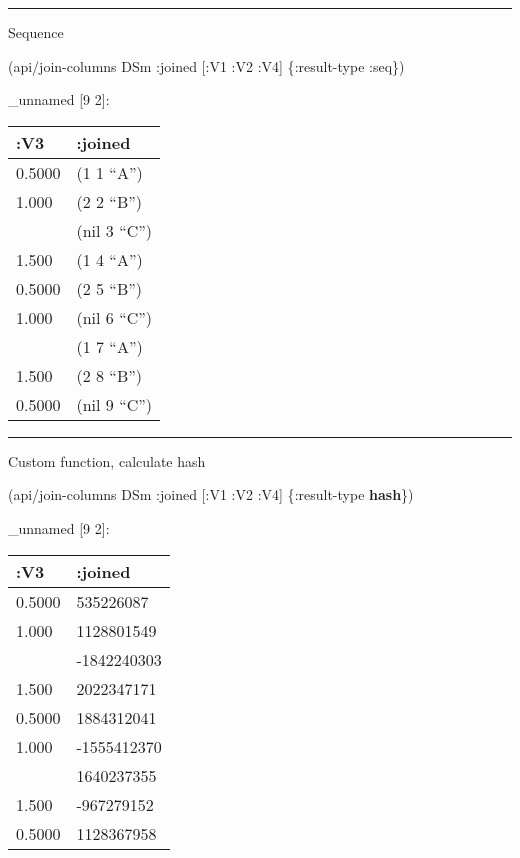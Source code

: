 \documentclass[]{article}
\newenvironment{Shaded}{\begin{snugshade}}{\end{snugshade}}
\newcommand{\KeywordTok}[1]{\textcolor[rgb]{0.13,0.29,0.53}{\textbf{#1}}}
\newcommand{\AttributeTok}[1]{\textcolor[rgb]{0.77,0.63,0.00}{#1}}
\newcommand{\NormalTok}[1]{#1}
\begin{document}
\begin{center}\rule{0.5\linewidth}{0.5pt}\end{center}

Sequence

\begin{Shaded}
\begin{Highlighting}[]
\NormalTok{(api/join-columns DSm }\AttributeTok{:joined}\NormalTok{ [}\AttributeTok{:V1} \AttributeTok{:V2} \AttributeTok{:V4}\NormalTok{] \{}\AttributeTok{:result-type} \AttributeTok{:seq}\NormalTok{\})}
\end{Highlighting}
\end{Shaded}

\_unnamed {[}9 2{]}:

\begin{longtable}[]{@{}ll@{}}
\toprule
:V3 & :joined\tabularnewline
\midrule
\endhead
0.5000 & (1 1 ``A'')\tabularnewline
1.000 & (2 2 ``B'')\tabularnewline
& (nil 3 ``C'')\tabularnewline
1.500 & (1 4 ``A'')\tabularnewline
0.5000 & (2 5 ``B'')\tabularnewline
1.000 & (nil 6 ``C'')\tabularnewline
& (1 7 ``A'')\tabularnewline
1.500 & (2 8 ``B'')\tabularnewline
0.5000 & (nil 9 ``C'')\tabularnewline
\bottomrule
\end{longtable}

\begin{center}\rule{0.5\linewidth}{0.5pt}\end{center}

Custom function, calculate hash

\begin{Shaded}
\begin{Highlighting}[]
\NormalTok{(api/join-columns DSm }\AttributeTok{:joined}\NormalTok{ [}\AttributeTok{:V1} \AttributeTok{:V2} \AttributeTok{:V4}\NormalTok{] \{}\AttributeTok{:result-type} \KeywordTok{hash}\NormalTok{\})}
\end{Highlighting}
\end{Shaded}

\_unnamed {[}9 2{]}:

\begin{longtable}[]{@{}ll@{}}
\toprule
:V3 & :joined\tabularnewline
\midrule
\endhead
0.5000 & 535226087\tabularnewline
1.000 & 1128801549\tabularnewline
& -1842240303\tabularnewline
1.500 & 2022347171\tabularnewline
0.5000 & 1884312041\tabularnewline
1.000 & -1555412370\tabularnewline
& 1640237355\tabularnewline
1.500 & -967279152\tabularnewline
0.5000 & 1128367958\tabularnewline
\bottomrule
\end{longtable}
\end{document}
